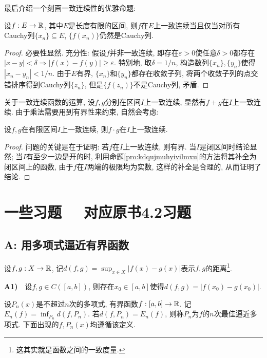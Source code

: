最后介绍一个刻画一致连续性的优雅命题: 

\begin{proposition}{}
	设$f:E \to \mathbb{R}$, 其中$E$是长度有限的区间, 则$f$在$E$上一致连续当且仅当对所有Cauchy列$\{ x_n \} \subseteq E$, $\{ f(x_n) \}$仍然是Cauchy列. 
\end{proposition}
\begin{proof}
	必要性显然. 充分性: 假设$f$并非一致连续, 即存在$\varepsilon >0$使任意$\delta >0$都存在$|x-y|<\delta \Rightarrow |f(x)-f(y)| \geq \varepsilon$. 特别地, 取$\delta = 1/n$, 构造数列$\{ x_n \},\{ y_n \}$使得$|x_n-y_n|<1/n$. 由于$E$有界, $\{ x_n \}$和$\{ y_n \}$都存在收敛子列, 将两个收敛子列的点交错排序得到Cauchy列$\{ z_n \}$, 但是$\{ f(z_n) \}$不是Cauchy列, 矛盾. 
\end{proof}

关于一致连续函数的运算, 设$f,g$分别在区间$I$上一致连续, 显然有$f+g$在$I$上一致连续. 由于乘法需要用到有界性来约束, 自然会考虑: 

\begin{proposition}{}
	设$f,g$在有限区间$I$上一致连续, 则$f \cdot g$在$I$上一致连续. 
\end{proposition}
\begin{proof}
	问题的关键是在于证明: 若$f$在$I$上一致连续, 则有界. 当$I$是闭区间时结论显然; 当$I$有至少一边是开的时, 利用命题\ref{pro:kdqujmuhyivilmxu}的方法将其补全为闭区间上的函数, 由于$f$在$I$两端的极限均为实数, 这样的补全是合理的, 从而证明了结论. 
\end{proof}

\newpage
\section*{一些习题 ~~\small 对应原书4.2习题}

\subsection*{A: 用多项式逼近有界函数}

设$f,g :X \to \mathbb{R}$, 记$d(f,g) = \sup_{x \in X} | f(x)-g(x) |$表示$f,g$的距离\footnote{这其实就是函数之间的一致度量.}. 
\vspace{1em}

\textbf{A1)}~~设$f,g \in C([a,b])$, 则存在$x_0 \in [a,b]$使得$d(f,g) = |f(x_0)-g(x_0)|$. 
\vspace{1em}

设$P_n(x)$是不超过$n$次的多项式, 有界函数$f:[a,b] \to \mathbb{R}$. 记$E_n(f)= \inf_{P_n} d(f,P_n)$. 若$d(f,P_n) = E_n(f)$, 则称$P_n$为$f$的$n$次最佳逼近多项式. 下面出现的$f,P_n(x)$均遵循该定义. 
\vspace{1em}

